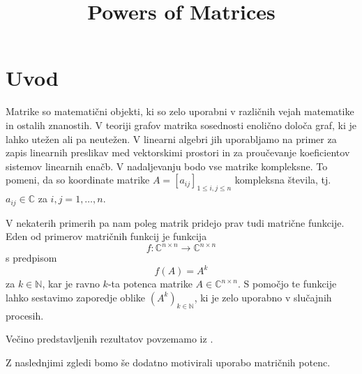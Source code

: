 \documentclass[mat1]{fmfdelo}
\title{Powers of Matrices}
\newcommand{\N}{\mathbb N}
\newcommand{\C}{\mathbb C}
\begin{document}
\section{Uvod}
Matrike so matematični objekti, ki so zelo uporabni v različnih vejah matematike in ostalih znanostih. V teoriji grafov matrika sosednosti enolično določa graf, ki je lahko utežen ali pa neutežen. V linearni algebri jih uporabljamo na primer za zapis linearnih preslikav med vektorskimi prostori in za proučevanje koeficientov sistemov linearnih enačb. V nadaljevanju bodo vse matrike kompleksne. To pomeni, da so koordinate matrike $A = [a_{ij}]_{1 \leq i,j \leq n}$ kompleksna števila, tj. $a_{ij} \in \C$ za $i,j = 1, \ldots, n$.

V nekaterih primerih pa nam poleg matrik pridejo prav tudi matrične funkcije. Eden od primerov matričnih funkcij je funkcija
\[f: \C^{n\times n} \rightarrow \C^{n\times n}\] s predpisom
\[f(A) = A^k\]
za $k\in\N$, kar je ravno $k$-ta potenca matrike $A\in\C^{n\times n}$. S pomočjo te funkcije lahko sestavimo zaporedje oblike $(A^k)_{k \in \N}$, ki je zelo uporabno v slučajnih procesih.

Večino predstavljenih rezultatov povzemamo iz \cite[2. poglavje, 3. poglavje, dodatek A]{kramar}.

Z naslednjimi zgledi bomo še dodatno motivirali uporabo matričnih potenc.
\end{document}
